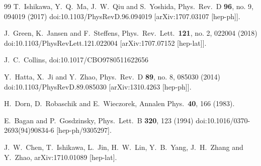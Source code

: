 \begin{thebibliography}{99}
  T.~Ishikawa, Y.~Q.~Ma, J.~W.~Qiu and S.~Yoshida,
  Phys.\ Rev.\ D {\bf 96}, no. 9, 094019 (2017)
  doi:10.1103/PhysRevD.96.094019
  [arXiv:1707.03107 [hep-ph]].

  J.~Green, K.~Jansen and F.~Steffens,
  Phys.\ Rev.\ Lett.\  {\bf 121}, no. 2, 022004 (2018)
  doi:10.1103/PhysRevLett.121.022004
  [arXiv:1707.07152 [hep-lat]].


  J.~C.~Collins,
  doi:10.1017/CBO9780511622656


  Y.~Hatta, X.~Ji and Y.~Zhao,
  Phys.\ Rev.\ D {\bf 89}, no. 8, 085030 (2014)
  doi:10.1103/PhysRevD.89.085030
  [arXiv:1310.4263 [hep-ph]].


  H.~Dorn, D.~Robaschik and E.~Wieczorek,
  Annalen Phys.\  {\bf 40}, 166 (1983).


  E.~Bagan and P.~Gosdzinsky,
  Phys.\ Lett.\ B {\bf 320}, 123 (1994)
  doi:10.1016/0370-2693(94)90834-6
  [hep-ph/9305297].


  J.~W.~Chen, T.~Ishikawa, L.~Jin, H.~W.~Lin, Y.~B.~Yang, J.~H.~Zhang and Y.~Zhao,
  arXiv:1710.01089 [hep-lat].


\end{thebibliography}
